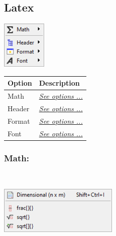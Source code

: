 \hypertarget{menu_insert_latex}{}
\subsection{Latex}

\includegraphics[scale=0.50]{./res/menu_insert_latex.png}\\

\begin{scriptsize}
  \begin{tabularx}{\textwidth}{>{\hsize=0.3\hsize}X>{\hsize=0.7\hsize}X}\\
    \hline
    \textbf{Option} & \textbf{Description} \\
    \hline
    Math & \textit{\href{\#menu\_insert\_latex\_math}{See options ...}} \\
    \hdashline[1pt/1pt]
    Header & \textit{\href{\#menu\_insert\_latex\_header}{See options ...}} \\
    Format & \textit{\href{\#menu\_insert\_latex\_format}{See options ...}} \\
    Font & \textit{\href{\#menu\_insert\_latex\_font}{See options ...}} \\
    \hline
  \end{tabularx}
\end{scriptsize}


\hypertarget{menu_insert_latex_math}{}
\subsubsection{Math:}\\

\includegraphics[scale=0.50]{./res/menu_insert_latex_math.png}\\

